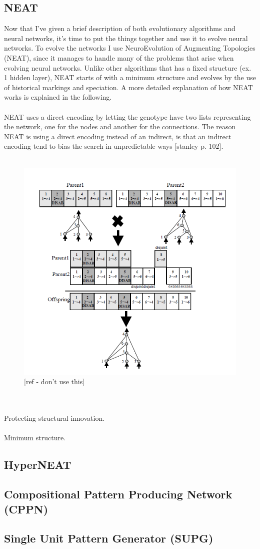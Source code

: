 \documentclass[11pt, a4paper]{article}
\begin{document}
\subsection{NEAT}
Now that I've given a brief description of both evolutionary algorithms and neural networks, it's time to put the things together and use it to evolve neural networks. To evolve the networks I use NeuroEvolution of Augmenting Topologies (NEAT), since it manages to handle many of the problems that arise when evolving neural networks. Unlike other algorithms that has a fixed structure (ex. 1 hidden layer), NEAT starts of with a minimum structure and evolves by the use of historical markings and speciation. A more detailed explanation of how NEAT works is explained in the following.
\\
\\
NEAT uses a direct encoding by letting the genotype have two lists representing the network, one for the nodes and another for the connections. The reason NEAT is using a direct encoding instead of an indirect, is that an indirect encoding tend to bias the search in unpredictable ways [stanley p. 102].
\\
\\ 
\begin{figure}[!ht]
\centering
\includegraphics[scale=0.5]{NEAT_Matching}
\caption{[ref - don't use this]}
\end{figure}
\\
\\
Protecting structural innovation.
\\
\\
Minimum structure.
\subsection{HyperNEAT}
\subsection{Compositional Pattern Producing Network (CPPN)}
\subsection{Single Unit Pattern Generator (SUPG)}
\end{document}
